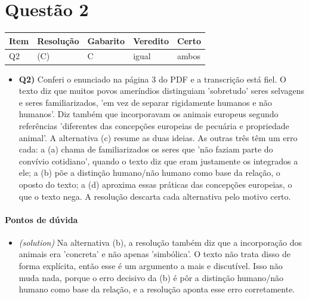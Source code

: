 \documentclass{article}%
\begin{document}
\section*{Questão 2}%
\begin{longtable}{@{}p{} p{} p{} p{} p{}@{}}\toprule Item & Resolução & Gabarito & Veredito & Certo \\ \midrule
Q2 & (C) & C & igual & ambos \\
\bottomrule\end{longtable}%
\begin{itemize}%
\item%
\textbf{Q2)} Conferi o enunciado na página 3 do PDF e a transcrição está fiel. O texto diz que muitos povos ameríndios distinguiam 'sobretudo' seres selvagens e seres familiarizados, 'em vez de separar rigidamente humanos e não humanos'. Diz também que incorporavam os animais europeus segundo referências 'diferentes das concepções europeias de pecuária e propriedade animal'. A alternativa (c) resume as duas ideias. As outras três têm um erro cada: a (a) chama de familiarizados os seres que 'não faziam parte do convívio cotidiano', quando o texto diz que eram justamente os integrados a ele; a (b) põe a distinção humano/não humano como base da relação, o oposto do texto; a (d) aproxima essas práticas das concepções europeias, o que o texto nega. A resolução descarta cada alternativa pelo motivo certo.%
\end{itemize}%
\paragraph{Pontos de dúvida}%
\begin{itemize}%
\item%
\textit{(solution)} Na alternativa (b), a resolução também diz que a incorporação dos animais era 'concreta' e não apenas 'simbólica'. O texto não trata disso de forma explícita, então esse é um argumento a mais e discutível. Isso não muda nada, porque o erro decisivo da (b) é pôr a distinção humano/não humano como base da relação, e a resolução aponta esse erro corretamente.%
\end{itemize}%
\end{document}
